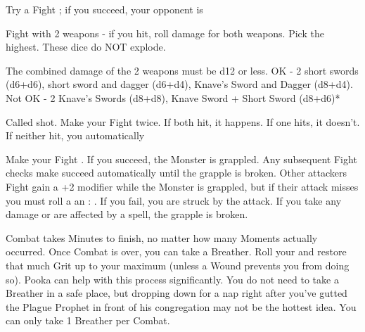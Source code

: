 {  

  Try a Fight \RO; if you succeed, your opponent is 


  Fight with 2 weapons - if you hit, roll damage for both weapons.  Pick the highest. These dice do NOT explode.

  The combined damage of the 2 weapons must be d12 or less.  OK - 2 short swords (d6+d6), short sword and dagger (d6+d4), Knave's Sword and Dagger (d8+d4).  Not OK - 2 Knave's Swords (d8+d8), Knave Sword + Short Sword (d8+d6)*


  Called shot.  Make your Fight \RO twice.  If both hit, it happens.  If one hits, it doesn't.  If neither hit, you automatically 



  Make your Fight \RO.  If you succeed, the Monster is grappled.  Any subsequent Fight checks  make succeed automatically until the grapple is broken.  Other attackers Fight \RO gain a +2 modifier while the Monster is grappled, but if their attack misses you must roll a an \RS : \DEX.  If you fail, you are struck by the attack.  If you take any damage or are affected by a spell, the grapple is broken.




  Combat takes Minutes to finish, no matter how many Moments actually occurred.  Once Combat is over, you can take a Breather.  Roll your \HD and restore that much Grit up to your maximum (unless a Wound prevents you from doing so).  Pooka can help with this process significantly.  You do not need to take a Breather in a safe place, but dropping down for a nap right after you've gutted the Plague Prophet in front of his congregation may not be the hottest idea.  You can only take 1 Breather per Combat.  


}
